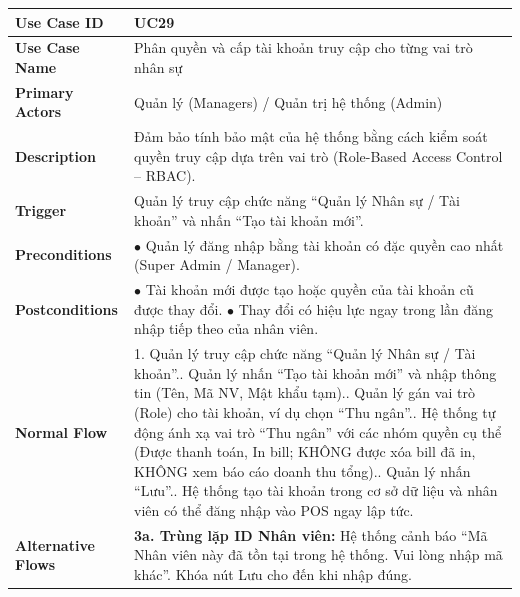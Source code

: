 \begin{longtable}{|p{3.5cm}|p{12.5cm}|}
\hline
\textbf{Use Case ID} & UC29 \\ \hline
\textbf{Use Case Name} & Phân quyền và cấp tài khoản truy cập cho từng vai trò nhân sự \\ \hline
\textbf{Primary Actors} & Quản lý (Managers) / Quản trị hệ thống (Admin) \\ \hline
\textbf{Description} & Đảm bảo tính bảo mật của hệ thống bằng cách kiểm soát quyền truy cập dựa trên vai trò (Role-Based Access Control -- RBAC). \\ \hline
\textbf{Trigger} & Quản lý truy cập chức năng ``Quản lý Nhân sự / Tài khoản'' và nhấn ``Tạo tài khoản mới''. \\ \hline
\textbf{Preconditions} & $\bullet$ Quản lý đăng nhập bằng tài khoản có đặc quyền cao nhất (Super Admin / Manager). \\ \hline
\textbf{Postconditions} &
$\bullet$ Tài khoản mới được tạo hoặc quyền của tài khoản cũ được thay đổi.\newline
$\bullet$ Thay đổi có hiệu lực ngay trong lần đăng nhập tiếp theo của nhân viên. \\ \hline
\textbf{Normal Flow} &
1. Quản lý truy cập chức năng ``Quản lý Nhân sự / Tài khoản''.\newline
2. Quản lý nhấn ``Tạo tài khoản mới'' và nhập thông tin (Tên, Mã NV, Mật khẩu tạm).\newline
3. Quản lý gán vai trò (Role) cho tài khoản, ví dụ chọn ``Thu ngân''.\newline
4. Hệ thống tự động ánh xạ vai trò ``Thu ngân'' với các nhóm quyền cụ thể (Được thanh toán, In bill; KHÔNG được xóa bill đã in, KHÔNG xem báo cáo doanh thu tổng).\newline
5. Quản lý nhấn ``Lưu''.\newline
6. Hệ thống tạo tài khoản trong cơ sở dữ liệu và nhân viên có thể đăng nhập vào POS ngay lập tức. \\ \hline
\textbf{Alternative Flows} &
\textbf{3a. Trùng lặp ID Nhân viên:} Hệ thống cảnh báo ``Mã Nhân viên này đã tồn tại trong hệ thống. Vui lòng nhập mã khác''. Khóa nút Lưu cho đến khi nhập đúng. \\ \hline
\end{longtable}

